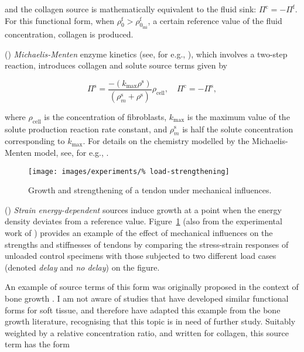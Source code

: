 \noindent and the collagen source is mathematically equivalent to the
fluid sink: $\Pi^\mathrm{c} = -\Pi^\mathrm{f}$. For this functional
form, when $\rho_{0}^\mathrm{f} > \rho_{0_\mathrm{ini}}^\mathrm{f}$, a
certain reference value of the fluid concentration, collagen is
produced.

() {\em Michaelis-Menten} enzyme kinetics (see, for
e.g., \cite{Sengersetal:2004}), which involves a two-step reaction, 
introduces collagen and solute source terms given by

\begin{equation}
\Pi^\mathrm{s} =
    \frac{-(k_{\mathrm{max}}\rho^{\mathrm{s}})}
    {(\rho^{\mathrm{s}}_m+\rho^{\mathrm{s}})}
    \rho_{\mathrm{cell}}, \quad\Pi^\mathrm{c} = -\Pi^\mathrm{s},
\label{enzyme-kinetics-source}
\end{equation}

\noindent where $\rho_{\mathrm{cell}}$ is the concentration of
fibroblasts, $k_{\mathrm{max}}$ is the maximum value of the solute
production reaction rate constant, and $\rho^{\mathrm{s}}_m$ is half
the solute concentration corresponding to $k_{\mathrm{max}}$. For
details on the chemistry modelled by the Michaelis-Menten model, see,
for e.g., \citet{sbromadill}.

\begin{figure}
  \centering
  \texttt{[image: images/experiments/\%
    load-strengthening]}
  \caption{Growth and strengthening of a tendon under mechanical
    influences.}
  \label{load-strengthening}
\end{figure}

() {\em Strain energy-dependent} sources induce growth
at a point when the energy density deviates from a reference
value. Figure~\ref{load-strengthening} (also from the experimental
work of \citet{calveetal:07}) provides an example of the effect of
mechanical influences on the strengths and stiffnesses of tendons by
comparing the stress-strain responses of unloaded control specimens
with those subjected to two different load cases (denoted {\em delay}
and {\em no delay}) on the figure.

An example of source terms of this form was originally proposed in the
context of bone growth \citep{HarriganHamilton:93}. I am not aware of
studies that have developed similar functional forms for soft tissue,
and therefore have adapted this example from the bone growth
literature, recognising that this topic is in need of further
study. Suitably weighted by a relative concentration ratio, and
written for collagen, this source term has the form

